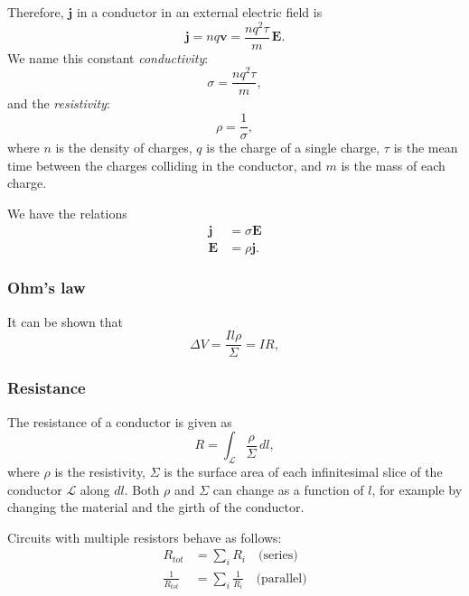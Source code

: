 \documentclass[a4paper, 12pt]{article}
\renewcommand{\vec}[1]{\mathbf{#1}}
\newcommand{\E}{\ensuremath{\vec{E}}}
\renewcommand{\j}{\ensuremath{\vec{j}}}
\begin{document}
        Therefore, $\j$ in a conductor in an external electric field is
        \begin{equation}
            \j = nq\vec{v} = \frac{nq^2\tau}{m}\,\E.
        \end{equation}
        We name this constant \textit{conductivity}: 
        \begin{equation}
            \sigma = \frac{nq^2\tau}{m},
        \end{equation}
        and the \textit{resistivity}:
        \begin{equation}
            \rho = \frac{1}{\sigma},
        \end{equation}
        where $n$ is the density of charges, $q$ is the charge of a single charge, $\tau$ is the mean time between the charges colliding in the conductor, and $m$ is the mass of each charge. 
        
        We have the relations 
        \begin{align}
            \j &= \sigma \E \\
            \E &= \rho \j.
        \end{align}
    \subsubsection{Ohm's law}
        It can be shown that 
        \begin{equation}
            \Delta V = \frac{Il\rho}{\Sigma} = IR,
        \end{equation}
    
    \subsubsection{Resistance}
        The resistance of a conductor is given as
        \begin{equation}
            R = \int_\mathcal{L} \frac{\rho}{\Sigma}\,dl,
        \end{equation}
        where $\rho$ is the resistivity, $\Sigma$ is the surface area of each infinitesimal slice of the conductor $\mathcal{L}$ along $dl$. Both $\rho$ and $\Sigma$ can change as a function of $l$, for example by changing the material and the girth of the conductor.
        
        Circuits with multiple resistors behave as follows: 
        \begin{align}
            R_{tot} &= \sum_i R_i\quad \text{(series)} \\
            \frac{1}{R_{tot}} &= \sum_i \frac{1}{R_i} \quad\text{(parallel)}
        \end{align}
        
\end{document}
